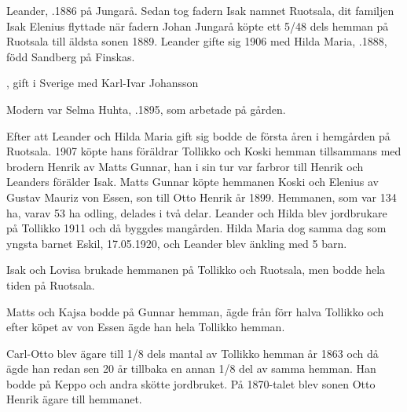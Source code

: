 Leander, .1886 på Jungarå. Sedan tog fadern Isak namnet Ruotsala, dit familjen Isak Elenius flyttade när fadern Johan Jungarå köpte ett 5/48 dels hemman på Ruotsala till äldsta sonen 1889. Leander gifte sig 1906 med Hilda Maria, .1888, född Sandberg på Finskas.
\begin{jhchildren}
  \item {}
  \item {}
  \item {}
  \item {}
  \item {}
  \item {}, gift i Sverige med Karl-Ivar Johansson
  \item {}
  \item {} Modern var Selma Huhta, .1895, som arbetade på gården.
\end{jhchildren}
Efter att Leander och Hilda Maria gift sig bodde de första åren i hemgården på Ruotsala. 1907 köpte hans föräldrar Tollikko och Koski hemman tillsammans med brodern Henrik av Matts Gunnar, han i sin tur var farbror till Henrik och Leanders förälder Isak. Matts Gunnar köpte hemmanen Koski och Elenius av Gustav Mauriz von Essen, son till Otto Henrik år 1899. Hemmanen, som var 134 ha, varav 53 ha odling, delades i två delar. Leander och Hilda blev jordbrukare på Tollikko 	1911 och då byggdes mangården. Hilda Maria dog samma dag som yngsta barnet Eskil, 17.05.1920, och Leander blev änkling med 5 barn.


Isak och Lovisa brukade hemmanen på Tollikko och Ruotsala, men bodde hela tiden på Ruotsala.


Matts och Kajsa bodde på Gunnar hemman, ägde från förr halva Tollikko och efter köpet av von Essen ägde han hela Tollikko hemman.


Carl-Otto blev ägare till 1/8 dels mantal av Tollikko hemman år 1863 och då ägde han redan sen 20 år tillbaka en annan 1/8 del av samma 	hemman. Han bodde på Keppo och andra skötte jordbruket. På 1870-talet blev sonen Otto Henrik ägare till hemmanet.


